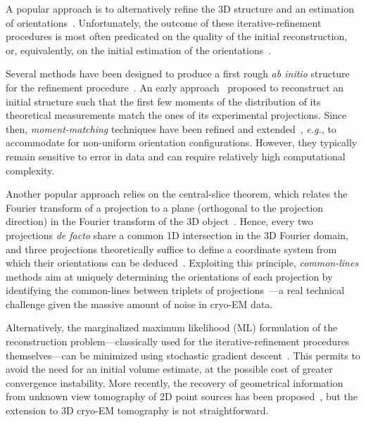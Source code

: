 
A popular approach is to alternatively refine the 3D structure and an estimation of orientations~\cite{penczek1994ribosome,Baker1996,Dempster1977,sigworth1998maximum,scheres2012bayesian,zehni2020joint}.
Unfortunately, the outcome of these iterative-refinement procedures is most often predicated on the quality of the initial reconstruction, or, equivalently, on the initial estimation of the orientations~\cite{sorzano2006optimization,henderson2012outcome}.

Several methods have been designed to produce a first rough \textit{ab initio} structure for the refinement procedure~\cite{singer2020computational}.
An early approach~\cite{kam1980reconstruction} proposed to reconstruct an initial structure such that the first few moments of the distribution of its theoretical measurements match the ones of its experimental projections.
Since then, \textit{moment-matching} techniques have been refined and extended~\cite{salzman1990method,goncharov1988integral,sharon2019method}, \textit{e.g.}, to accommodate for non-uniform orientation configurations.
However, they typically remain sensitive to error in data and can require relatively high computational complexity.

Another popular approach relies on the central-slice theorem, which relates the Fourier transform of a projection to a plane (orthogonal to the projection direction) in the Fourier transform of the 3D object~\cite{Natterer2001mathematics}.
Hence, every two projections \textit{de facto} share a common 1D intersection in the 3D Fourier domain, and three projections theoretically suffice to define a coordinate system from which their orientations can be deduced~\cite{van1987angular}.
Exploiting this principle, \textit{common-lines} methods aim at uniquely determining the orientations of each projection by identifying the common-lines between triplets of projections~\cite{penczek1994ribosome,mallick2006structure,singer2010detecting,wang2013orientation,greenberg2017common,pragier2019common}---a real technical challenge given the massive amount of noise in cryo-EM data.

Alternatively, the marginalized maximum likelihood (ML) formulation of the reconstruction problem---classically used for the iterative-refinement procedures themselves---can be minimized using stochastic gradient descent~\cite{punjani2017cryosparc}.
This permits to avoid the need for an initial volume estimate, at the possible cost of greater convergence instability.
More recently, the recovery of geometrical information from unknown view tomography of 2D point sources has been proposed~\cite{zehni2019distance}, but the extension to 3D cryo-EM tomography is not straightforward.

